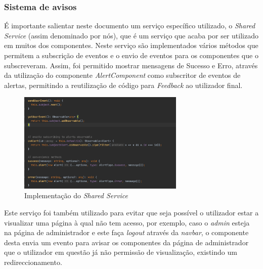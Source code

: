 \documentclass[10pt,english]{article}
\begin{document}
\subsubsection{Sistema de avisos}

\par É importante salientar neste documento um serviço específico utilizado, o \textit{Shared Service} (assim denominado por nós), que é um serviço que acaba por ser utilizado em muitos dos componentes. Neste serviço são implementados vários métodos que permitem a subscrição de eventos e o envio de eventos para os componentes que o subscreveram. Assim, foi permitido mostrar mensagens de Sucesso e Erro, através da utilização do componente \textit{AlertComponent} como subscritor de eventos de alertas, permitindo a reutilização de código para \textit{Feedback} ao utilizador final. 

\begin{figure}[!h]
        \centering
        \includegraphics[width=300]{images/service_shared.png}
        \caption{Implementação do \textit{Shared Service} }
\end{figure}


\par Este serviço foi também utilizado para evitar que seja possível o utilizador estar a visualizar uma página à qual não tem acesso, por exemplo, caso o \textit{admin} esteja na página de administrador e este faça \textit{logout} através da \textit{navbar}, o componente desta envia um evento para avisar os componentes da página de administrador que o utilizador em questão já não permissão de visualização, existindo um redireccionamento.
\end{document}
